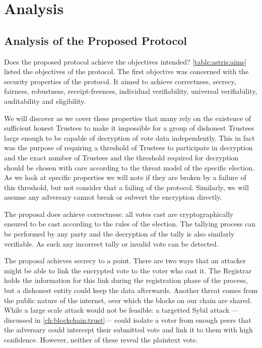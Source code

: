 
\chapter{Analysis}
\label{ch:analysis}

\section{Analysis of the Proposed Protocol}
\label{ch:analysis:analysis}

Does the proposed protocol achieve the objectives intended? \autoref{table:astris:aims} listed the objectives of the protocol. The first objective was concerned with the security properties of the protocol. It aimed to achieve correctness, secrecy, fairness, robustness, receipt-freeness, individual verifiability, universal verifiability, auditability and eligibility.

We will discover as we cover these properties that many rely on the existence of sufficient honest Trustees to make it impossible for a group of dishonest Trustees large enough to be capable of decryption of vote data independently. This in fact was the purpose of requiring a threshold of Trustees to participate in decryption and the exact number of Trustees and the threshold required for decryption should be chosen with care according to the threat model of the specific election. As we look at specific properties we will note if they are broken by a failure of this threshold, but not consider that a failing of the protocol. Similarly, we will assume any adversary cannot break or subvert the encryption directly.

The proposal does achieve correctness: all votes cast are cryptographically ensured to be cast according to the rules of the election. The tallying process can be performed by any party and the decryption of the tally is also similarly verifiable. As such any incorrect tally or invalid vote can be detected.

The proposal achieves secrecy to a point. There are two ways that an attacker might be able to link the encrypted vote to the voter who cast it. The Registrar holds the information for this link during the registration phase of the process, but a dishonest entity could keep the data afterwards. Another threat comes from the public nature of the internet, over which the blocks on our chain are shared. While a large scale attack would not be feasible: a targetted Sybil attack ---discussed in \autoref{ch:blockchain:trust}--- could isolate a voter from enough peers that the adversary could intercept their submitted vote and link it to them with high confidence. However, neither of these reveal the plaintext vote.

